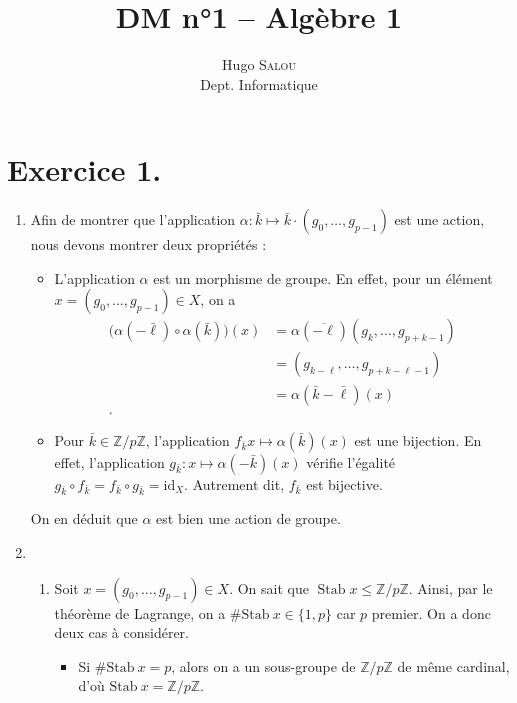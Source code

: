\documentclass{../../td}
\title{DM n°1 -- Algèbre 1}
\author{Hugo {\scshape Salou}\\ Dept. Informatique}
\begin{document}
  \maketitle

  \chapter*{Exercice 1.}

  \begin{enumerate}
    \item Afin de montrer que l'application $\alpha : \bar{k} \mapsto \bar{k} \cdot (g_0,\ldots,g_{p-1})$ est une action, nous devons montrer deux propriétés :
      \begin{itemize}
        \item L'application $\alpha$ est un morphisme de groupe.
          En effet, pour un élément $x = (g_0, \ldots, g_{p-1}) \in X$, on a
          \begin{align*}
            \big(\alpha(-\bar{\ell})\circ\alpha(\bar{k})\big)(x)
            &= \alpha(\overline{-\ell})(g_{k},\ldots,g_{p+k-1}) \\
            &= (g_{k-\ell}, \ldots, g_{p+k-\ell-1}) \\
            &= \alpha(\bar{k} - \bar\ell)(x) \\
          .\end{align*}
        \item Pour $\bar{k} \in \mathds{Z} / p \mathds{Z}$, l'application $f_{\bar{k}} x \mapsto \alpha(\bar{k})(x)$ est une bijection.
          En effet, l'application $g_{\bar{k}} : x \mapsto \alpha(-\bar{k})(x)$ vérifie l'égalité $g_{\bar{k}} \circ f_{\bar{k}} = f_{\bar{k}} \circ g_{\bar{k}} = \mathrm{id}_X$.
          Autrement dit, $f_{\bar{k}}$ est bijective.
      \end{itemize}
      On en déduit que $\alpha$ est bien une action de groupe.
    \item 
      \begin{enumerate}
        \item Soit $x  = (g_0,\ldots,g_{p-1})\in X$. On sait que $\operatorname{Stab} x \le \mathds{Z} / p \mathds{Z}$.
          Ainsi, par le théorème de Lagrange, on a $\#\mathrm{Stab}\ x \in \{1, p\}$ car $p$ premier.
          On a donc deux cas à considérer.
          \begin{itemize}
            \item Si $\# \mathrm{Stab}\ x = p$, alors on a un sous-groupe de $\mathds{Z} / p \mathds{Z}$ de même cardinal, d'où $\mathrm{Stab}\ x = \mathds{Z}/p\mathds{Z}$.

\end{itemize}
\end{enumerate}
\end{enumerate}
\end{document}
